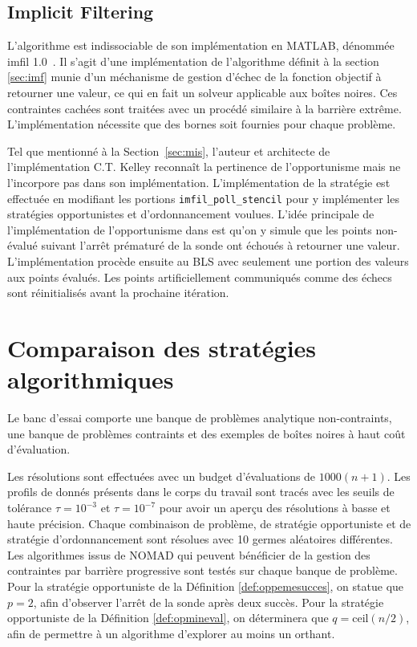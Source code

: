 \subsection{Implicit Filtering}\label{sec:mim}
L'algorithme \imfil est indissociable de son implémentation en MATLAB, dénommée imfil 1.0~\cite{Kelley2011,Kelley2011b}. Il s'agit d'une implémentation de l'algorithme définit à la section \ref{sec:imf} munie d'un méchanisme de gestion d'échec de la fonction objectif à retourner une valeur, ce qui en fait un solveur applicable aux boîtes noires. Ces contraintes cachées sont traitées avec un procédé similaire à la barrière extrême. L'implémentation nécessite que des bornes soit fournies pour chaque problème.

Tel que mentionné à la Section~\ref{sec:mis}, l'auteur et architecte de l'implémentation C.T. Kelley reconnaît la pertinence de l'opportunisme mais ne l'incorpore pas dans son implémentation. L'implémentation de la stratégie est effectuée en modifiant les portions \texttt{imfil\_poll\_stencil} pour y implémenter les stratégies opportunistes et d'ordonnancement voulues. L'idée principale de l'implémentation de l'opportunisme dans \imfil est qu'on y simule que les points non-évalué suivant l'arrêt prématuré de la sonde ont échoués à retourner une valeur. L'implémentation procède ensuite au \textsf{BLS} avec seulement une portion des valeurs aux points évalués. Les points artificiellement communiqués comme des échecs sont réinitialisés avant la prochaine itération.
\section{Comparaison des stratégies algorithmiques}\label{sec:com}
Le banc d'essai comporte une banque de problèmes analytique non-contraints, une banque de problèmes contraints et des exemples de boîtes noires à haut coût d'évaluation. 

Les résolutions sont effectuées avec un budget d'évaluations de $1000(n+1)$. Les profils de donnés présents dans le corps du travail sont tracés avec les seuils de tolérance $\tau = 10^{-3}$ et $\tau = 10^{-7}$ pour avoir un aperçu des résolutions à basse et haute précision. Chaque combinaison de problème, de stratégie opportuniste et de stratégie d'ordonnancement sont résolues avec 10 germes aléatoires différentes. Les algorithmes issus de NOMAD qui peuvent bénéficier de la gestion des contraintes par barrière progressive sont testés sur chaque banque de problème. Pour la stratégie opportuniste de la Définition \ref{def:oppemesucces}, on statue que $p=2$, afin d'observer l'arrêt de la sonde après deux succès. Pour la stratégie opportuniste de la Définition \ref{def:opmineval}, on déterminera que $q = \text{ceil}(n/2)$, afin de permettre à un algorithme d'explorer au moins un orthant.

